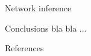 \documentclass[final]{beamer}
\newlength{\sepwid}
\newlength{\twocolwid}
\begin{document}
\begin{frame}[t]
\begin{columns}[t]
\begin{column}{\twocolwid}
\begin{block}{\textsf{Network inference}}
      \end{block}


      \begin{block}{\textsf{Conclusions}}
        \large
        bla bla ...
      \end{block}

      \vspace{1cm}
      \begin{block}{\textsf{References}}
        { \small
          
        }
      \end{block}

    \end{column}%


  \end{columns}
\end{frame}
\end{document}
